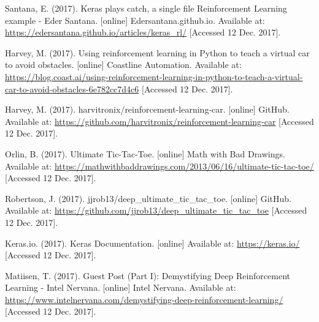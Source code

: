 \begin{thebibliography}{100}

 Santana, E. (2017). Keras plays catch, a single file Reinforcement Learning example - Eder Santana. [online] Edersantana.github.io. Available at: \url{https://edersantana.github.io/articles/keras_rl/} [Accessed 12 Dec. 2017].

 Harvey, M. (2017). Using reinforcement learning in Python to teach a virtual car to avoid obstacles. [online] Coastline Automation. Available at: \url{https://blog.coast.ai/using-reinforcement-learning-in-python-to-teach-a-virtual-car-to-avoid-obstacles-6e782cc7d4c6} [Accessed 12 Dec. 2017].
 
 Harvey, M. (2017). harvitronix/reinforcement-learning-car. [online] GitHub. Available at: \url{https://github.com/harvitronix/reinforcement-learning-car} [Accessed 12 Dec. 2017].

 Orlin, B. (2017). Ultimate Tic-Tac-Toe. [online] Math with Bad Drawings. Available at: \url{https://mathwithbaddrawings.com/2013/06/16/ultimate-tic-tac-toe/} [Accessed 12 Dec. 2017].

 Robertson, J. (2017). jjrob13/deep\_ultimate\_tic\_tac\_toe. [online] GitHub. Available at: \url{https://github.com/jjrob13/deep_ultimate_tic_tac_toe} [Accessed 12 Dec. 2017].

 Keras.io. (2017). Keras Documentation. [online] Available at: \url{https://keras.io/} [Accessed 12 Dec. 2017].

  Matiisen, T. (2017). Guest Post (Part I): Demystifying Deep Reinforcement Learning - Intel Nervana. [online] Intel Nervana. Available at: \url{https://www.intelnervana.com/demystifying-deep-reinforcement-learning/} [Accessed 12 Dec. 2017].

\end{thebibliography}